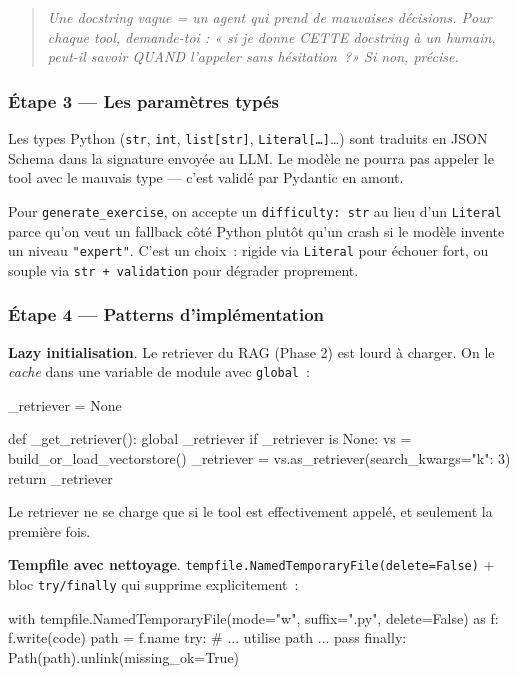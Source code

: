 \documentclass[11pt,a4paper]{article}
\begin{document}
\begin{quote}\itshape
Une docstring vague = un agent qui prend de mauvaises décisions. Pour
chaque tool, demande-toi : « si je donne CETTE docstring à un humain,
peut-il savoir QUAND l'appeler sans hésitation~?» Si non, précise.
\end{quote}

\subsubsection*{Étape 3 — Les paramètres typés}

Les types Python (\texttt{str}, \texttt{int}, \texttt{list[str]},
\texttt{Literal[\dots]}\dots) sont traduits en JSON Schema dans la
signature envoyée au LLM. Le modèle ne pourra pas appeler le tool avec
le mauvais type — c'est validé par Pydantic en amont.

Pour \texttt{generate\_exercise}, on accepte un \texttt{difficulty: str}
au lieu d'un \texttt{Literal} parce qu'on veut un fallback côté Python
plutôt qu'un crash si le modèle invente un niveau \texttt{"expert"}.
C'est un choix~: rigide via \texttt{Literal} pour échouer fort, ou
souple via \texttt{str + validation} pour dégrader proprement.

\subsubsection*{Étape 4 — Patterns d'implémentation}

\textbf{Lazy initialisation}. Le retriever du RAG (Phase 2) est lourd à
charger. On le \emph{cache} dans une variable de module avec
\texttt{global}~:

\begin{pythoncode}
_retriever = None

def _get_retriever():
    global _retriever
    if _retriever is None:
        vs = build_or_load_vectorstore()
        _retriever = vs.as_retriever(search_kwargs={"k": 3})
    return _retriever
\end{pythoncode}

Le retriever ne se charge que si le tool est effectivement appelé, et
seulement la première fois.

\textbf{Tempfile avec nettoyage}.
\texttt{tempfile.NamedTemporaryFile(delete=False)} + bloc
\texttt{try/finally} qui supprime explicitement~:

\begin{pythoncode}
with tempfile.NamedTemporaryFile(mode="w", suffix=".py", delete=False) as f:
    f.write(code)
    path = f.name
try:
    # ... utilise path ...
    pass
finally:
    Path(path).unlink(missing_ok=True)
\end{pythoncode}
\end{document}
